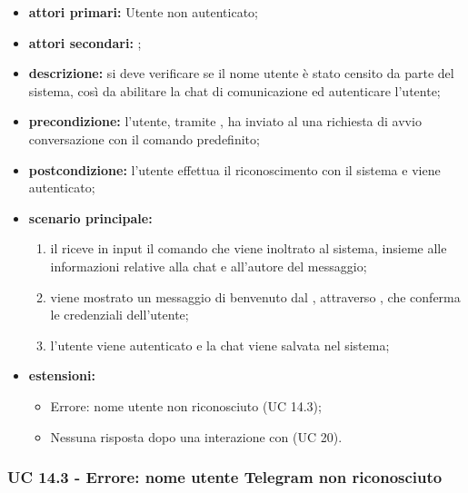 	\begin{itemize}
		\item \textbf{attori primari:} Utente non autenticato;
		\item \textbf{attori secondari:} ;
		\item \textbf{descrizione:} si deve verificare se il nome utente è stato censito da parte del sistema, così da abilitare la chat di comunicazione ed autenticare l'utente;
		\item \textbf{precondizione:} l'utente, tramite , ha inviato al  una richiesta di avvio conversazione con il comando predefinito;
		\item \textbf{postcondizione:} l'utente effettua il riconoscimento con il sistema e viene autenticato;
		\item \textbf{scenario principale:}
		\begin{enumerate}
			\item il   riceve in input il comando che viene inoltrato al sistema, insieme alle informazioni relative alla chat e all'autore del messaggio;
			\item viene mostrato un messaggio di benvenuto dal , attraverso , che conferma le credenziali dell'utente;
			\item l'utente viene autenticato e la chat viene salvata nel sistema;
		\end{enumerate}
		\item \textbf{estensioni:}
		\begin{itemize}
			\item Errore: nome utente  non riconosciuto (UC 14.3);
			\item Nessuna risposta dopo una interazione con  (UC 20).
		\end{itemize}
	\end{itemize}

	\subsubsection{UC 14.3 - Errore: nome utente Telegram non riconosciuto}


